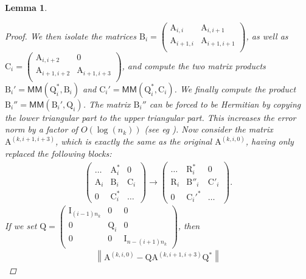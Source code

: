 \documentclass{article}
\newcommand{\lnorm}{\left\|}
\newcommand{\rnorm}{\right\|}
\newtheorem{lemma}{Lemma}[section]
\newcommand\matA{\boldsymbol{\mathrm{A}}}
\newcommand\matB{\boldsymbol{\mathrm{B}}}
\newcommand\matC{\boldsymbol{\mathrm{C}}}
\newcommand\matI{\boldsymbol{\mathrm{I}}}
\newcommand\matQ{\boldsymbol{\mathrm{Q}}}
\newcommand\matR{\boldsymbol{\mathrm{R}}}
\newcommand{\MM}{\mathsf{MM}}
\begin{document}
\begin{lemma}
\begin{proof}
        We then isolate the matrices $\matB_{i}=\begin{pmatrix}
            \matA_{i,i} & \matA_{i,i+1} \\
            \matA_{i+1,i} & \matA_{i+1,i+1} \\
        \end{pmatrix}$,
        as well as $\matC_{i}=\begin{pmatrix}
            \matA_{i,i+2} & 0 \\
            \matA_{i+1,i+2} & \matA_{i+1,i+3} \\
        \end{pmatrix}$, and compute the two matrix products $\matB_i'= \MM(\matQ_i^*,\matB_i)$ and $\matC_i'= \MM(\matQ_i^*,\matC_i)$. We finally compute the product $\matB_i''= \MM(\matB_i',\matQ_i)$. The matrix $\matB_i''$ can be forced to be Hermitian by copying the lower triangular part to the upper triangular part. This increases the error norm by a factor of $O(\log(n_k))$ (see eg \cite{sobczyk2024invariant}). Now consider the matrix $\matA^{(k,i+1,i+3)}$, which is exactly the same as the original $\matA^{(k,i,0)}$, having only replaced the following blocks:
        \begin{align*}
        \begin{pmatrix}
        \ldots            &\matA_i^*        & 0       \\
        \matA_{i}         & \matB_{i}       & \matC_i \\
        0                 & \matC_{i}^*     & \ldots
        \end{pmatrix}
        \longrightarrow
        \begin{pmatrix}
        \ldots            &\matR_i^*        & 0       \\
        \matR_{i}         & \matB''_{i}     & \matC'_i \\
        0                 & \matC_{i}'^*    & \ldots
        \end{pmatrix}.
        \end{align*}
        If we set $\matQ=\begin{pmatrix}
            \matI_{(i-1)n_k} & 0       & 0 \\
               0             & \matQ_i &  0\\
               0             & 0       & \matI_{n-(i+1)n_k}
        \end{pmatrix}$, then
        \begin{align}
            \label{eq:lemma_rotation_r_i_backward_error}
            \lnorm \matA^{(k,i,0)} - \matQ\matA^{(k,i+1,i+3)} \matQ^* \rnorm

\end{align}
\end{proof}
\end{lemma}
\end{document}
